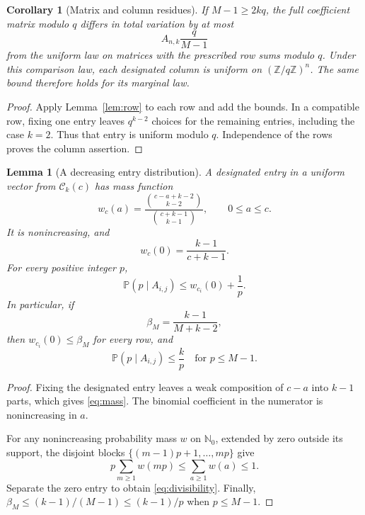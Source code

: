 \documentclass[11pt]{amsart}
\newcommand{\Nzero}{\mathbb N_0}
\newcommand{\Z}{\mathbb Z}
\newcommand{\Prob}{\mathbb P}
\newtheorem{lemma}[theorem]{Lemma}
\newtheorem{corollary}[theorem]{Corollary}
\theoremstyle{definition}
\theoremstyle{remark}
\begin{document}
\begin{corollary}[Matrix and column residues]\label{cor:matrix}
If $M-1\ge2kq$, the full coefficient matrix modulo $q$ differs in total
variation by at most
\begin{equation}\label{eq:matrixTV}
A_{n,k}\frac{q}{M-1}
\end{equation}
from the uniform law on matrices with the prescribed row sums modulo
$q$. Under this comparison law, each designated column is uniform on
$(\Z/q\Z)^n$. The same bound therefore holds for its marginal law.
\end{corollary}

\begin{proof}
Apply Lemma~\ref{lem:row} to each row and add the bounds. In a
compatible row, fixing one entry leaves $q^{k-2}$ choices for the
remaining entries, including the case $k=2$. Thus that entry is
uniform modulo $q$. Independence of the rows proves the column
assertion.
\end{proof}

\begin{lemma}[A decreasing entry distribution]\label{lem:decreasing}
A designated entry in a uniform vector from $\mathcal C_k(c)$ has mass
function
\begin{equation}\label{eq:mass}
w_c(a)=\frac{\binom{c-a+k-2}{k-2}}{\binom{c+k-1}{k-1}},
\qquad0\le a\le c.
\end{equation}
It is nonincreasing, and
\[
w_c(0)=\frac{k-1}{c+k-1}.
\]
For every positive integer $p$,
\begin{equation}\label{eq:divisibility}
\Prob(p\mid A_{i,j})\le w_{c_i}(0)+\frac1p.
\end{equation}
In particular, if
\begin{equation}\label{eq:beta}
\beta_M=\frac{k-1}{M+k-2},
\end{equation}
then $w_{c_i}(0)\le\beta_M$ for every row, and
\begin{equation}\label{eq:kp}
\Prob(p\mid A_{i,j})\le\frac{k}{p}
\quad\text{for }p\le M-1.
\end{equation}
\end{lemma}

\begin{proof}
Fixing the designated entry leaves a weak composition of $c-a$ into
$k-1$ parts, which gives \eqref{eq:mass}. The binomial coefficient in
the numerator is nonincreasing in $a$.

For any nonincreasing probability mass $w$ on $\Nzero$, extended by zero
outside its support, the disjoint blocks
$\{(m-1)p+1,\ldots,mp\}$ give
\[
p\sum_{m\ge1}w(mp)\le\sum_{a\ge1}w(a)\le1.
\]
Separate the zero entry to obtain \eqref{eq:divisibility}. Finally,
$\beta_M\le(k-1)/(M-1)\le(k-1)/p$ when $p\le M-1$.
\end{proof}
\end{document}
